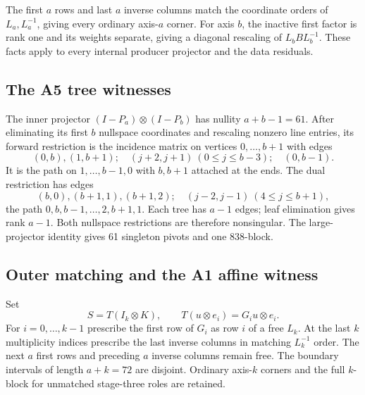 The first $a$ rows and last $a$ inverse columns match the coordinate
orders of $L_a,L_a^{-1}$, giving every ordinary axis-$a$ corner.
For axis $b$, the inactive first factor is rank one and its weights
separate, giving a diagonal rescaling of $L_bBL_b^{-1}$. These facts
apply to every internal producer projector and the data residuals.

\subsection{The A5 tree witnesses}
The inner projector $(I-P_a)\otimes(I-P_b)$ has nullity $a+b-1=61$.
After eliminating its first $b$ nullspace coordinates and rescaling
nonzero line entries, its forward restriction is the incidence matrix
on vertices $0,\ldots,b+1$ with edges
\[
(0,b),(1,b+1);\quad (j+2,j+1)\ (0\le j\le b-3);\quad (0,b-1).
\]
It is the path on $1,\ldots,b-1,0$ with $b,b+1$ attached at the ends.
The dual restriction has edges
\[
(b,0),(b+1,1),(b+1,2);\quad (j-2,j-1)\ (4\le j\le b+1),
\]
the path $0,b,b-1,\ldots,2,b+1,1$.
Each tree has $a-1$ edges; leaf elimination gives rank $a-1$.
Both nullspace restrictions are therefore nonsingular. The
large-projector identity gives 61 singleton pivots and one 838-block.

\subsection{Outer matching and the A1 affine witness}
Set
\[
 S=T(I_k\otimes K),\qquad T(u\otimes e_i)=G_i u\otimes e_i.
\]
For $i=0,\ldots,k-1$ prescribe the first row of $G_i$ as row $i$ of a
free $L_k$. At the last $k$ multiplicity indices prescribe the last
inverse columns in matching $L_k^{-1}$ order. The next $a$ first rows
and preceding $a$ inverse columns remain free. The boundary intervals
of length $a+k=72$ are disjoint. Ordinary axis-$k$ corners and the
full $k$-block for unmatched stage-three roles are retained.

